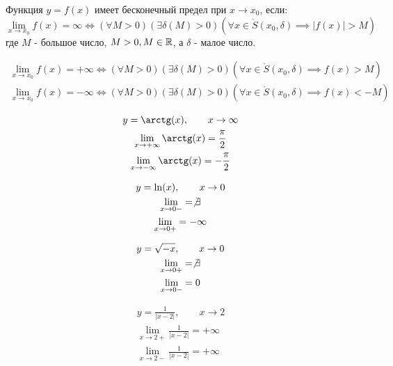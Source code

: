 \begin{definition}
  Функция $y = f(x)$ имеет бесконечный предел при $x \to x_0$, если: \[
  \lim_{x \to x_0} f(x) = \infty \iff
  (\forall M > 0)(\exists \delta(M) > 0)(\forall x \in \mathring{S}(x_0, \delta) \implies |f(x)| > M)
  \] 
  где $M$ - большое число, $M > 0, M \in \mathbb{R}$,
  а $\delta$ - малое число.
\end{definition}
\begin{note}
  \begin{gather*}
    \lim_{x \to x_0} f(x) = +\infty \iff
    (\forall M > 0)(\exists \delta(M) > 0)(\forall x \in \mathring{S}(x_0, \delta) \implies f(x) > M) 
    \\
    \lim_{x \to x_0} f(x) = -\infty \iff
    (\forall M > 0)(\exists \delta(M) > 0)(\forall x \in \mathring{S}(x_0, \delta) \implies f(x) < -M)
  \end{gather*}
\end{note}
\begin{eg}
  \begin{gather*}
    y = \arctg(x), \qquad x \to \infty \\
    \lim_{x \to +\infty} \arctg(x) = \frac{\pi}{2} \\
    \lim_{x \to -\infty} \arctg(x) = -\frac{\pi}{2} \\
  \end{gather*}  
\end{eg}
\begin{eg}
  \begin{gather*}
    y = \ln(x), \qquad x \to 0 \\
    \lim_{x \to 0-} = \not\exists  \\
    \lim_{x \to 0+} = -\infty
  \end{gather*}
\end{eg}
\begin{eg}
  \begin{gather*}
    y = \sqrt{-x}, \qquad x \to 0 \\
    \lim_{x \to 0+} = \not\exists \\
    \lim_{x \to 0-} = 0
  \end{gather*}
\end{eg}
\begin{eg}
  \begin{gather*}
    y = \frac{1}{|x - 2|}, \qquad x \to 2 \\
    \lim_{x \to 2+} \frac{1}{|x - 2|} = +\infty \\
    \lim_{x \to 2-} \frac{1}{|x - 2|} = +\infty \\
  \end{gather*}
\end{eg}

